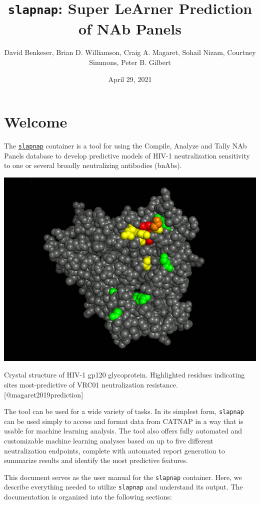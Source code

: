 \documentclass[]{article}
\title{\texttt{slapnap}: Super LeArner Prediction of NAb Panels}
\author{David Benkeser, Brian D. Williamson, Craig A. Magaret, Sohail Nizam,
Courtney Simmons, Peter B. Gilbert}
\date{April 29, 2021}
\begin{document}
\maketitle

{
\setcounter{tocdepth}{2}
\tableofcontents
}
\section*{Welcome}\label{welcome}

The \href{https://hub.docker.com/r/slapnap/slapnap}{\texttt{slapnap}}
container is a tool for using the Compile, Analyze and Tally NAb Panels
\citep[CATNAP;][]{yoon2015catnap} database to develop predictive models
of HIV-1 neutralization sensitivity to one or several broadly
neutralizing antibodies (bnAbs).

\begin{center}\includegraphics[width=0.7\linewidth]{gp120} \end{center}\begin{center}
Crystal structure of HIV-1 gp120 glycoprotein. Highlighted residues
indicating sites most-predictive of VRC01 neutralization resistance.
{[}@magaret2019prediction{]}
\end{center}

The tool can be used for a wide variety of tasks. In its simplest form,
\texttt{slapnap} can be used simply to access and format data from
CATNAP in a way that is usable for machine learning analysis. The tool
also offers fully automated and customizable machine learning analyses
based on up to five different neutralization endpoints, complete with
automated report generation to summarize results and identify the most
predictive features.

This document serves as the user manual for the \texttt{slapnap}
container. Here, we describe everything needed to utilize
\texttt{slapnap} and understand its output. The documentation is
organized into the following sections:
\end{document}
